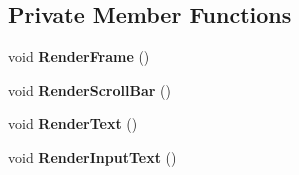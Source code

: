 \subsection*{Private Member Functions}
\begin{DoxyCompactItemize}
\item 
void {\bfseries Render\+Frame} ()\hypertarget{class_console_a8e113a2a59fdb02689042b4e53cd5608}{}\label{class_console_a8e113a2a59fdb02689042b4e53cd5608}

\item 
void {\bfseries Render\+Scroll\+Bar} ()\hypertarget{class_console_a466e397fdf905d31903efda5835609e8}{}\label{class_console_a466e397fdf905d31903efda5835609e8}

\item 
void {\bfseries Render\+Text} ()\hypertarget{class_console_a6ae098af143802a2e3b6663568970c90}{}\label{class_console_a6ae098af143802a2e3b6663568970c90}

\item 
void {\bfseries Render\+Input\+Text} ()\hypertarget{class_console_a180276113ca697dad64eec27e6642960}{}\label{class_console_a180276113ca697dad64eec27e6642960}

\end{DoxyCompactItemize}
